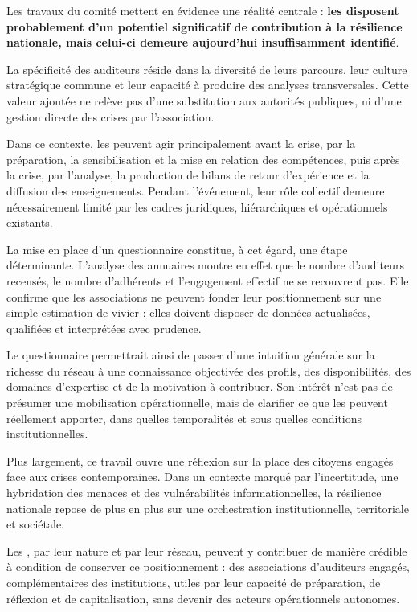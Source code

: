 Les travaux du comité mettent en évidence une réalité centrale : \textbf{les \AssociationsRegionalesIHEDN{} disposent probablement d'un potentiel significatif de contribution à la résilience nationale, mais celui-ci demeure aujourd'hui insuffisamment identifié}.

La spécificité des auditeurs réside dans la diversité de leurs parcours, leur culture stratégique commune et leur capacité à produire des analyses transversales. Cette valeur ajoutée ne relève pas d'une substitution aux autorités publiques, ni d'une gestion directe des crises par l'association.

Dans ce contexte, les \AssociationsRegionalesIHEDN{} peuvent agir principalement avant la crise, par la préparation, la sensibilisation et la mise en relation des compétences, puis après la crise, par l'analyse, la production de bilans de retour d'expérience et la diffusion des enseignements. Pendant l'événement, leur rôle collectif demeure nécessairement limité par les cadres juridiques, hiérarchiques et opérationnels existants.

La mise en place d'un questionnaire constitue, à cet égard, une étape déterminante. L'analyse des annuaires montre en effet que le nombre d'auditeurs recensés, le nombre d'adhérents et l'engagement effectif ne se recouvrent pas. Elle confirme que les associations ne peuvent fonder leur positionnement sur une simple estimation de vivier : elles doivent disposer de données actualisées, qualifiées et interprétées avec prudence.

Le questionnaire permettrait ainsi de passer d'une intuition générale sur la richesse du réseau à une connaissance objectivée des profils, des disponibilités, des domaines d'expertise et de la motivation à contribuer. Son intérêt n'est pas de présumer une mobilisation opérationnelle, mais de clarifier ce que les \AssociationsRegionalesIHEDN{} peuvent réellement apporter, dans quelles temporalités et sous quelles conditions institutionnelles.

Plus largement, ce travail ouvre une réflexion sur la place des citoyens engagés face aux crises contemporaines. Dans un contexte marqué par l'incertitude, une hybridation des menaces et des vulnérabilités informationnelles, la résilience nationale repose de plus en plus sur une orchestration institutionnelle, territoriale et sociétale.

Les \AssociationsRegionalesIHEDN{}, par leur nature et par leur réseau, peuvent y contribuer de manière crédible à condition de conserver ce positionnement : des associations d'auditeurs engagés, complémentaires des institutions, utiles par leur capacité de préparation, de réflexion et de capitalisation, sans devenir des acteurs opérationnels autonomes.